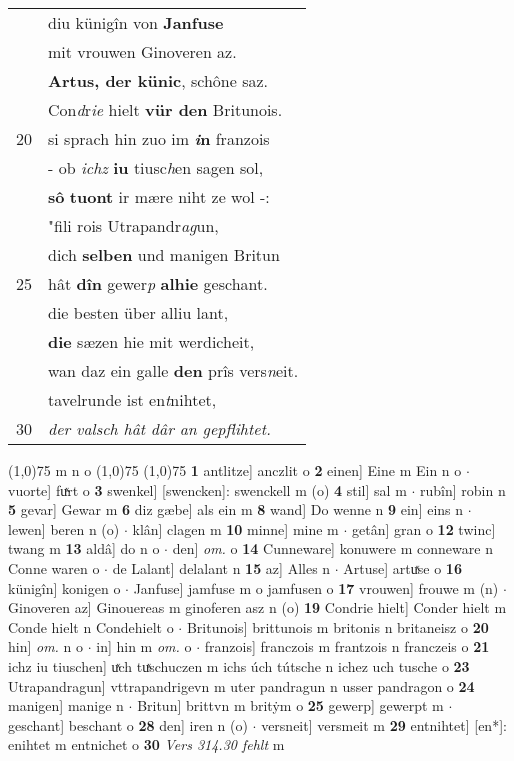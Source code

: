 \documentclass[8pt,a4paper,notitlepage]{article}
\begin{document}
\begin{table}[ht]
\begin{minipage}[t]{0.5\linewidth}
\begin{tabular}{rl}
 & diu künigîn von \textbf{Janfuse}\\ 
 & mit vrouwen Ginoveren az.\\ 
 & \textbf{Artus, der künic}, schône saz.\\ 
 & Con\textit{d}r\textit{ie} hielt \textbf{vür den} Britunois.\\ 
20 & si sprach hin zuo im \textbf{\textit{i}n} franzois\\ 
 & - ob \textit{ichz} \textbf{iu} tiusc\textit{h}en sagen sol,\\ 
 & \textbf{sô} \textbf{tuont} ir mære niht ze wol -:\\ 
 & "fili rois Utrapandr\textit{ag}un,\\ 
 & dich \textbf{selben} und manigen Britun\\ 
25 & hât \textbf{dîn} gewer\textit{p} \textbf{alhie} geschant.\\ 
 & die besten über alliu lant,\\ 
 & \textbf{die} sæzen hie mit werdicheit,\\ 
 & wan daz ein galle \textbf{den} prîs vers\textit{n}eit.\\ 
 & tavelrunde ist en\textit{t}nihtet,\\ 
30 & \textit{der valsch hât dâr an gepflihtet.}\\ 
\end{tabular}
\scriptsize
\line(1,0){75} \newline
m n o \newline
\line(1,0){75} \newline
\newline
\line(1,0){75} \newline
\textbf{1} antlitze] anczlit o \textbf{2} einen] Eine m Ein n o  $\cdot$ vuorte] fuͯrt o \textbf{3} swenkel] [swencken]: swenckell m (o) \textbf{4} stil] sal m  $\cdot$ rubîn] robin n \textbf{5} gevar] Gewar m \textbf{6} diz gæbe] als ein m \textbf{8} wand] Do wenne n \textbf{9} ein] eins n  $\cdot$ lewen] beren n (o)  $\cdot$ klân] clagen m \textbf{10} minne] mine m  $\cdot$ getân] gran o \textbf{12} twinc] twang m \textbf{13} aldâ] do n o  $\cdot$ den] \textit{om.} o \textbf{14} Cunneware] konuwere m conneware n Conne waren o  $\cdot$ de Lalant] delalant n \textbf{15} az] Alles n  $\cdot$ Artuse] artuͯse o \textbf{16} künigîn] konigen o  $\cdot$ Janfuse] jamfuse m o jamfusen o \textbf{17} vrouwen] frouwe m (n)  $\cdot$ Ginoveren az] Ginouereas m ginoferen asz n (o) \textbf{19} Condrie hielt] Conder hielt m Conde hielt n Condehielt o  $\cdot$ Britunois] brittunois m britonis n britaneisz o \textbf{20} hin] \textit{om.} n o  $\cdot$ in] hin m \textit{om.} o  $\cdot$ franzois] franczois m frantzois n franczeis o \textbf{21} ichz iu tiuschen] uͯch tuͯschuczen m ichs úch tútsche n ichez uch tusche o \textbf{23} Utrapandragun] vttrapandrigevn m uter pandragun n usser pandragon o \textbf{24} manigen] manige n  $\cdot$ Britun] brittvn m britẏm o \textbf{25} gewerp] gewerpt m  $\cdot$ geschant] beschant o \textbf{28} den] iren n (o)  $\cdot$ versneit] versmeit m \textbf{29} entnihtet] [en*]: enihtet m entnichet o \textbf{30} \textit{Vers 314.30 fehlt} m  \newline

\end{minipage}
\end{table}
\end{document}

